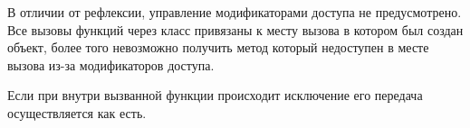 В отличии от рефлексии, управление модификаторами доступа не предусмотрено. Все вызовы функций через класс  привязаны к месту вызова в котором был создан  объект, более того невозможно получить метод который недоступен в месте вызова из-за модификаторов доступа.

Если при внутри вызванной функции происходит исключение его передача осуществляется как есть.
